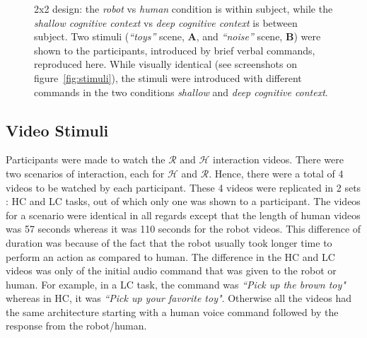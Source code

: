 \documentclass[a4,twocolumn,10pt]{article}
\begin{document}
\begin{figure}
    \caption{\small 2x2 design: the \emph{robot} vs \emph{human} condition is within
        subject, while the \emph{shallow cognitive context} vs \emph{deep
        cognitive context} is between subject. Two stimuli (\emph{``toys''}
        scene, {\bf A}, and \emph{``noise''} scene, {\bf B})
        were shown to the participants, introduced by brief verbal commands, reproduced
        here. While visually identical (see screenshots on
        figure~\ref{fig:stimuli}), the stimuli were introduced with different
        commands in the two conditions \emph{shallow} and \emph{deep cognitive
        context}.}

    \label{}
\end{figure}

\subsection{Video Stimuli}

Participants were made to watch the $\mathcal{R}$ and $\mathcal{H}$ interaction
videos. There were two scenarios of interaction, each for $\mathcal{H}$ and
$\mathcal{R}$. Hence, there were a total of 4 videos to be watched by each
participant. These 4 videos were replicated in 2 sets : HC and LC tasks, out of
which only one was shown to a participant. The videos for a scenario were
identical in all regards except that the length of human videos was 57 seconds
whereas it was 110 seconds for the robot videos. This difference of duration was
because of the fact that the robot usually took longer time to perform an action
as compared to human. The difference in the HC and LC videos was only of the
initial audio command that was given to the robot or human. For example, in a LC
task, the command was \textit{``Pick up the brown toy"} whereas in HC, it was
\textit{``Pick up your favorite toy"}. Otherwise all the videos had the same
architecture starting with a human voice command followed by the response from
the robot/human.
\end{document}
